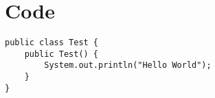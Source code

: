\section{Code}

\begin{lstlisting}[style=Java]
public class Test {
	public Test() {
		System.out.println("Hello World");
	}	
}
\end{lstlisting}